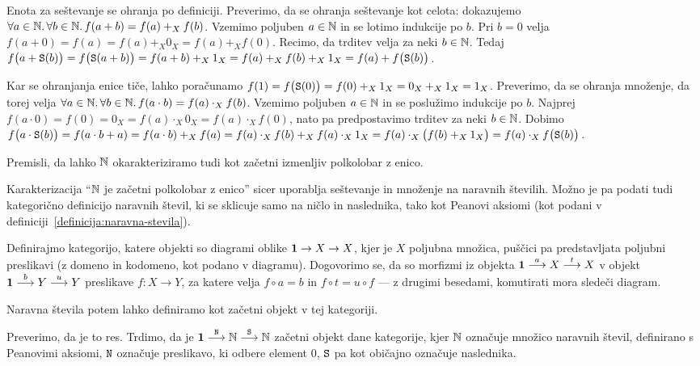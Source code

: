 Enota za seštevanje se ohranja po definiciji. Preverimo, da se ohranja seštevanje kot celota: dokazujemo $\forall a \in \mathbb{N} .\,\forall b \in \mathbb{N} .\,{f(a + b) = f(a) +_X f(b)}$. Vzemimo poljuben $a \in \mathbb{N}$ in se lotimo indukcije po $b$. Pri $b = 0$ velja $f(a + 0) = f(a) = f(a) +_X 0_X = f(a) +_X f(0)$. Recimo, da trditev velja za neki $b \in \mathbb{N}$. Tedaj $f\big(a + \mathtt{S}(b)\big) = f\big(\mathtt{S}(a + b)\big) = f(a + b) +_X 1_X = f(a) +_X f(b) +_X 1_X = f(a) + f\big(\mathtt{S}(b)\big)$.

Kar se ohranjanja enice tiče, lahko poračunamo $f(1) = f\big(\mathtt{S}(0)\big) = f(0) +_X 1_X = 0_X +_X 1_X = 1_X$. Preverimo, da se ohranja množenje, da torej velja $\forall a \in \mathbb{N} .\,\forall b \in \mathbb{N} .\,{f(a \cdot b) = f(a) \cdot_X f(b)}$. Vzemimo poljuben $a \in \mathbb{N}$ in se poslužimo indukcije po $b$. Najprej $f(a \cdot 0) = f(0) = 0_X = f(a) \cdot_X 0_X = f(a) \cdot_X f(0)$, nato pa predpostavimo trditev za neki $b \in \mathbb{N}$. Dobimo $f\big(a \cdot \mathtt{S}(b)\big) = f(a \cdot b + a) = f(a \cdot b) +_X f(a) = f(a) \cdot_X f(b) +_X f(a) \cdot_X 1_X = f(a) \cdot_X \big(f(b) +_X 1_X\big) = f(a) \cdot_X f\big(\mathtt{S}(b)\big)$.

\begin{naloga}
Premisli, da lahko $\mathbb{N}$ okarakteriziramo tudi kot začetni izmenljiv polkolobar z enico.
\end{naloga}

Karakterizacija ``$\mathbb{N}$ je začetni polkolobar z enico'' sicer uporablja seštevanje in množenje na naravnih številih. Možno je pa podati tudi kategorično definicijo naravnih števil, ki se sklicuje samo na ničlo in naslednika, tako kot Peanovi aksiomi (kot podani v definiciji~\ref{definicija:naravna-stevila}).

Definirajmo kategorijo, katere objekti so diagrami oblike $\mathtt{\mathbf{1}} \to X \to X$, kjer je $X$ poljubna množica, puščici pa predstavljata poljubni preslikavi (z domeno in kodomeno, kot podano v diagramu). Dogovorimo se, da so morfizmi iz objekta $\mathtt{\mathbf{1}} \stackrel{a}{\longrightarrow} X \stackrel{t}{\longrightarrow} X$ v objekt $\mathtt{\mathbf{1}} \stackrel{b}{\longrightarrow} Y \stackrel{u}{\longrightarrow} Y$ preslikave $f\colon X \to Y$, za katere velja $f \circ a = b$ in $f \circ t = u \circ f$ --- z drugimi besedami, komutirati mora sledeči diagram.


Naravna števila potem lahko definiramo kot začetni objekt v tej kategoriji.

Preverimo, da je to res. Trdimo, da je $\mathtt{\mathbf{1}} \stackrel{\mathtt{N}}{\longrightarrow} \mathbb{N} \stackrel{\mathtt{S}}{\longrightarrow} \mathbb{N}$ začetni objekt dane kategorije, kjer $\mathbb{N}$ označuje množico naravnih števil, definirano s Peanovimi aksiomi, $\mathtt{N}$ označuje preslikavo, ki odbere element $0$, $\mathtt{S}$ pa kot običajno označuje naslednika.


